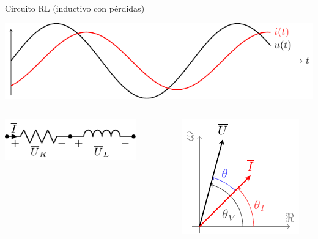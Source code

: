 \documentclass[aspectratio=169, xcolor={usenames,svgnames,dvipsnames}]{beamer}
\begin{document}
\begin{frame}[label={sec:orgff21356}]{Circuito RL (inductivo con pérdidas)}
\begin{center}
\includegraphics[height=0.25\textheight]{figs/inductivo.pdf}
\end{center}
\begin{columns}
\begin{column}{0.45\columnwidth}
\begin{center}
\includegraphics[width=0.8\textwidth]{figs/RL.pdf}
\end{center}
\end{column}


\begin{column}{0.55\columnwidth}
\begin{center}
\includegraphics[height=0.5\textheight]{figs/fasorInductanciaReal_VI.pdf}
\end{center}
\end{column}
\end{columns}
\end{frame}
\end{document}
